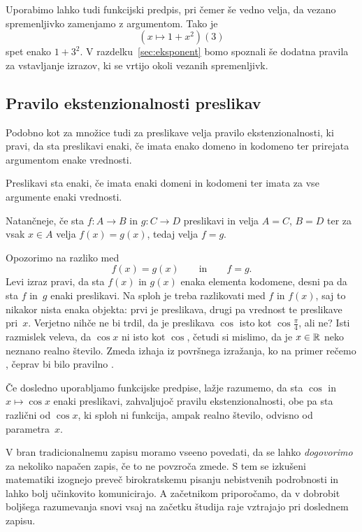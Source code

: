 Uporabimo lahko tudi funkcijski predpis, pri čemer še vedno velja, da vezano spremenljivko zamenjamo z argumentom.
Tako je
%
\begin{equation*}
  (x \mapsto 1 + x^2)(3)
\end{equation*}
%
spet enako $1 + 3^2$.
%
V razdelku~\ref{sec:eksponent} bomo spoznali še dodatna pravila za vstavljanje izrazov, ki se vrtijo okoli vezanih spremenljivk.


\subsection{Pravilo ekstenzionalnosti preslikav}

Podobno kot za množice tudi za preslikave velja pravilo ekstenzionalnosti, ki pravi, da sta preslikavi enaki, če imata enako domeno in kodomeno ter prirejata argumentom enake vrednosti.


\begin{pravilo}
  Preslikavi sta enaki, če imata enaki domeni in kodomeni ter imata za vse argumente
  enaki vrednosti.
\end{pravilo}

Natančneje, če sta $f : A \to B$ in $g : C \to D$ preslikavi in velja $A = C$, $B = D$ ter
za vsak $x \in A$ velja $f(x) = g(x)$, tedaj velja $f = g$.

Opozorimo na razliko med
%
\begin{equation*}
  f(x) = g(x)
  \qquad\text{in}\qquad
  f = g.
\end{equation*}
%
Levi izraz pravi, da sta $f(x)$ in $g(x)$ enaka elementa kodomene, desni pa da sta $f$ in~$g$ enaki preslikavi.
%
Na sploh je treba razlikovati med $f$ in $f(x)$, saj to nikakor nista enaka objekta: prvi je
preslikava, drugi pa vrednost te preslikave pri~$x$. Verjetno nihče ne bi trdil, da je
preslikava $\cos$ isto kot $\cos \frac{\pi}{4}$, ali ne? Isti razmislek veleva, da
$\cos x$ ni isto kot $\cos$, četudi si mislimo, da je $x \in \mathbb{R}$ neko neznano realno število.
Zmeda izhaja iz površnega izražanja, ko na primer rečemo , čeprav bi bilo pravilno .

Če dosledno uporabljamo funkcijske predpise, lažje razumemo, da sta $\cos$ in $x \mapsto \cos x$ enaki preslikavi, zahvaljujoč pravilu ekstenzionalnosti, obe pa sta različni od $\cos x$, ki sploh ni funkcija, ampak realno število, odvisno od parametra~$x$.

V bran tradicionalnemu zapisu moramo vseeno povedati, da se lahko \emph{dogovorimo} za
nekoliko napačen zapis, če to ne povzroča zmede. S tem se izkušeni matematiki izognejo preveč birokratskemu
pisanju nebistvenih podrobnosti in lahko bolj učinkovito komunicirajo.
%
A začetnikom priporočamo, da v dobrobit boljšega razumevanja snovi vsaj na začetku študija raje vztrajajo pri doslednem zapisu.

